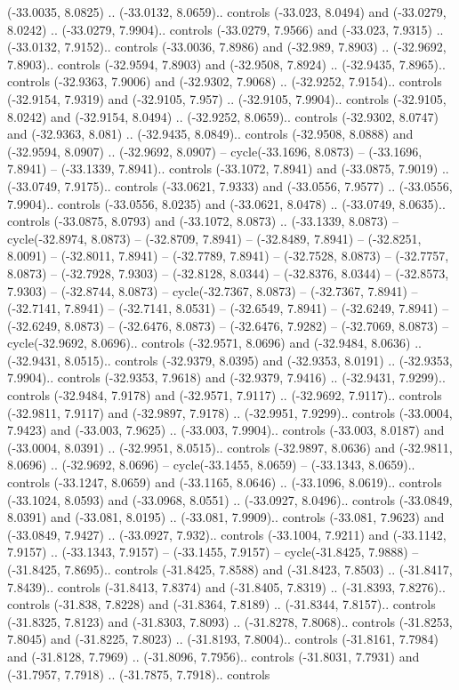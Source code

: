 \begin{scope}[shift={(2.5552, 9.9912)}]
\begin{scope}[shift={(48.1654, -14.8546)}]
(-33.0035, 8.0825) .. (-33.0132, 8.0659).. controls (-33.023, 8.0494) and (-33.0279, 8.0242) .. (-33.0279, 7.9904).. controls (-33.0279, 7.9566) and (-33.023, 7.9315) .. (-33.0132, 7.9152).. controls (-33.0036, 7.8986) and (-32.989, 7.8903) .. (-32.9692, 7.8903).. controls (-32.9594, 7.8903) and (-32.9508, 7.8924) .. (-32.9435, 7.8965).. controls (-32.9363, 7.9006) and (-32.9302, 7.9068) .. (-32.9252, 7.9154).. controls (-32.9154, 7.9319) and (-32.9105, 7.957) .. (-32.9105, 7.9904).. controls (-32.9105, 8.0242) and (-32.9154, 8.0494) .. (-32.9252, 8.0659).. controls (-32.9302, 8.0747) and (-32.9363, 8.081) .. (-32.9435, 8.0849).. controls (-32.9508, 8.0888) and (-32.9594, 8.0907) .. (-32.9692, 8.0907) -- cycle(-33.1696, 8.0873) -- (-33.1696, 7.8941) -- (-33.1339, 7.8941).. controls (-33.1072, 7.8941) and (-33.0875, 7.9019) .. (-33.0749, 7.9175).. controls (-33.0621, 7.9333) and (-33.0556, 7.9577) .. (-33.0556, 7.9904).. controls (-33.0556, 8.0235) and (-33.0621, 8.0478) .. (-33.0749, 8.0635).. controls (-33.0875, 8.0793) and (-33.1072, 8.0873) .. (-33.1339, 8.0873) -- cycle(-32.8974, 8.0873) -- (-32.8709, 7.8941) -- (-32.8489, 7.8941) -- (-32.8251, 8.0091) -- (-32.8011, 7.8941) -- (-32.7789, 7.8941) -- (-32.7528, 8.0873) -- (-32.7757, 8.0873) -- (-32.7928, 7.9303) -- (-32.8128, 8.0344) -- (-32.8376, 8.0344) -- (-32.8573, 7.9303) -- (-32.8744, 8.0873) -- cycle(-32.7367, 8.0873) -- (-32.7367, 7.8941) -- (-32.7141, 7.8941) -- (-32.7141, 8.0531) -- (-32.6549, 7.8941) -- (-32.6249, 7.8941) -- (-32.6249, 8.0873) -- (-32.6476, 8.0873) -- (-32.6476, 7.9282) -- (-32.7069, 8.0873) -- cycle(-32.9692, 8.0696).. controls (-32.9571, 8.0696) and (-32.9484, 8.0636) .. (-32.9431, 8.0515).. controls (-32.9379, 8.0395) and (-32.9353, 8.0191) .. (-32.9353, 7.9904).. controls (-32.9353, 7.9618) and (-32.9379, 7.9416) .. (-32.9431, 7.9299).. controls (-32.9484, 7.9178) and (-32.9571, 7.9117) .. (-32.9692, 7.9117).. controls (-32.9811, 7.9117) and (-32.9897, 7.9178) .. (-32.9951, 7.9299).. controls (-33.0004, 7.9423) and (-33.003, 7.9625) .. (-33.003, 7.9904).. controls (-33.003, 8.0187) and (-33.0004, 8.0391) .. (-32.9951, 8.0515).. controls (-32.9897, 8.0636) and (-32.9811, 8.0696) .. (-32.9692, 8.0696) -- cycle(-33.1455, 8.0659) -- (-33.1343, 8.0659).. controls (-33.1247, 8.0659) and (-33.1165, 8.0646) .. (-33.1096, 8.0619).. controls (-33.1024, 8.0593) and (-33.0968, 8.0551) .. (-33.0927, 8.0496).. controls (-33.0849, 8.0391) and (-33.081, 8.0195) .. (-33.081, 7.9909).. controls (-33.081, 7.9623) and (-33.0849, 7.9427) .. (-33.0927, 7.932).. controls (-33.1004, 7.9211) and (-33.1142, 7.9157) .. (-33.1343, 7.9157) -- (-33.1455, 7.9157) -- cycle(-31.8425, 7.9888) -- (-31.8425, 7.8695).. controls (-31.8425, 7.8588) and (-31.8423, 7.8503) .. (-31.8417, 7.8439).. controls (-31.8413, 7.8374) and (-31.8405, 7.8319) .. (-31.8393, 7.8276).. controls (-31.838, 7.8228) and (-31.8364, 7.8189) .. (-31.8344, 7.8157).. controls (-31.8325, 7.8123) and (-31.8303, 7.8093) .. (-31.8278, 7.8068).. controls (-31.8253, 7.8045) and (-31.8225, 7.8023) .. (-31.8193, 7.8004).. controls (-31.8161, 7.7984) and (-31.8128, 7.7969) .. (-31.8096, 7.7956).. controls (-31.8031, 7.7931) and (-31.7957, 7.7918) .. (-31.7875, 7.7918).. controls 
\end{scope}
\end{scope}
